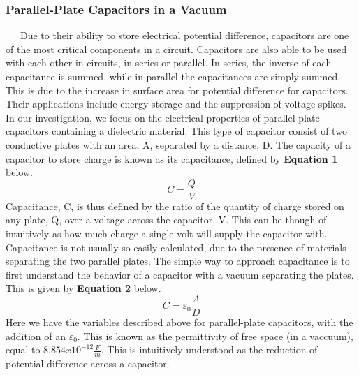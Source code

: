 \documentclass{article}
\begin{document}
\subsubsection*{Parallel-Plate Capacitors in a Vacuum}
\ \ \ Due to their ability to store electrical potential difference, capacitors are one of the most critical components in a circuit. Capacitors are also able to be used with each other in circuits, in series or parallel. In series, the inverse of each capacitance is summed, while in parallel the capacitances are simply summed. This is due to the increase in surface area for potential difference for capacitors. Their applications include energy storage and the suppression of voltage spikes. In our investigation, we focus on the electrical properties of parallel-plate capacitors containing a dielectric material. This type of capacitor consist of two conductive plates with an area, A, separated by a distance, D. The capacity of a capacitor to store charge is known as its capacitance, defined by \textbf{Equation 1} below.
\begin{equation}
C = \frac{Q}{V}
\end{equation}
Capacitance, C, is thus defined by the ratio of the quantity of charge stored on any plate, Q, over a voltage across the capacitor, V. This can be though of intuitively as how much charge a single volt will supply the capacitor with. Capacitance is not usually so easily calculated, due to the presence of materials separating the two parallel plates. The simple way to approach capacitance is to first understand the behavior of a capacitor with a vacuum separating the plates. This is given by \textbf{Equation 2} below.
\begin{equation}
C = \varepsilon_0\frac{A}{D}
\end{equation}
Here we have the variables described above for parallel-plate capacitors, with the addition of an $\varepsilon_0$. This is known as the permittivity of free space (in a vaccuum), equal to $8.854x10^{-12}\frac{F}{m}$. This is intuitively understood as the reduction of potential difference across a capacitor.
\end{document}
